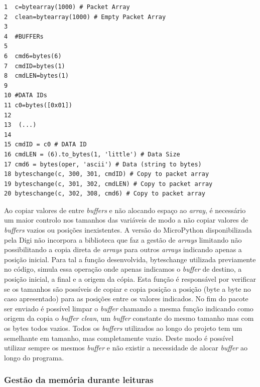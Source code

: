 \begin{verbatim}
1  c=bytearray(1000) # Packet Array
2  clean=bytearray(1000) # Empty Packet Array 
3 
4  #BUFFERs
5 
6  cmd6=bytes(6)
7  cmdID=bytes(1)
8  cmdLEN=bytes(1)
9 
10 #DATA IDs
11 c0=bytes([0x01])
12
13  (...) 
14
15 cmdID = c0 # DATA ID
16 cmdLEN = (6).to_bytes(1, 'little') # Data Size
17 cmd6 = bytes(oper, 'ascii') # Data (string to bytes)
18 byteschange(c, 300, 301, cmdID) # Copy to packet array 
19 byteschange(c, 301, 302, cmdLEN) # Copy to packet array 
20 byteschange(c, 302, 308, cmd6) # Copy to packet array 
\end{verbatim}

\par Ao copiar valores de entre \textit{buffers} e não alocando espaço ao \textit{array}, é necessário um maior controlo nos tamanhos das variáveis de modo a não copiar valores de \textit{buffers} vazios ou posições inexistentes. A versão do MicroPython disponibilizada pela Digi não incorpora a biblioteca que faz a gestão de \textit{arrays} limitando não possibilitando a copia direta de \textit{arrays} para outros \textit{arrays} indicando apenas a posição inicial. Para tal a função desenvolvida, byteschange utilizada previamente no código, simula essa operação onde apenas indicamos o \textit{buffer} de destino, a posição inicial, a final e a origem da cópia. Esta função é responsável por verificar se os tamanhos são possíveis de copiar e copia posição a posição (byte a byte no caso apresentado) para as posições entre os valores indicados. No fim do pacote ser enviado é possível limpar o \textit{buffer} chamando a mesma função indicando como origem da copia o \textit{buffer clean}, um \textit{buffer} constante do mesmo tamanho mas com os bytes todos vazios. Todos os \textit{buffers} utilizados ao longo do projeto tem um semelhante em tamanho, mas completamente vazio. Deste modo é possível utilizar sempre os mesmos \textit{buffer} e não existir a necessidade de alocar \textit{buffer} ao longo do programa.

\subsubsection {Gestão da memória durante leituras}

